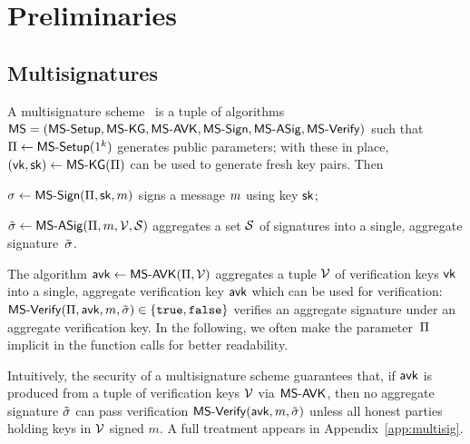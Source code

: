 \section{Preliminaries}\label{sec:prel}

\subsection{Multisignatures}\label{sec:multisig}
%
A multisignature scheme~\cite{itakura1983public,CCS:MicOhtRey01} is a
tuple of algorithms 
$\mathsf{MS} = (\mathsf{MS\textsf{-}{}Setup},\allowbreak\mathsf{MS\textsf{-}{}KG},\allowbreak\mathsf{MS\textsf{-}{}AVK},\allowbreak
\mathsf{MS\textsf{-}{}Sign},\mathsf{MS\textsf{-}{}ASig},\mathsf{MS\textsf{-}{}Verify})$ such that
$\Pi \gets \mathsf{MS\textsf{-}{}Setup}(1^k)$ generates public parameters;
with these in place,
$(\mathsf{vk},\mathsf{sk}) \gets \mathsf{MS\textsf{-}{}KG}(\Pi)$ can be used to generate
fresh key pairs. Then
\begin{mitemize}
  \item $\sigma \gets \mathsf{MS\textsf{-}{}Sign}(\Pi,\mathsf{sk},m)$ signs 
    a message $m$ using key $\mathsf{sk}$;
  \item $\tilde \sigma \gets \mathsf{MS\textsf{-}{}ASig}(\Pi,m,\mathcal V,\mathcal S)$ aggregates a
    set $\mathcal S$ of signatures into a single, aggregate signature~$\tilde \sigma$.
  \end{mitemize}
  The algorithm $\mathsf{avk} \gets \mathsf{MS\textsf{-}{}AVK}(\Pi,\mathcal V)$ aggregates
  a tuple $\mathcal V$ of verification keys $\mathsf{vk}$ into a single,
  aggregate verification key $\mathsf{avk}$ which can be used for verification:
  $\mathsf{MS\textsf{-}{}Verify}(\Pi,\mathsf{avk},m,\tilde \sigma) \in \{\mathtt{true},\mathtt{false}\}$
  verifies an aggregate signature under an aggregate verification key.
  In the following, we often make the parameter~$\Pi$ implicit in the
    function calls for better readability.

  Intuitively, the security of a multisignature scheme guarantees
  that, if $\mathsf{avk}$ is produced from a tuple of verification keys
  $\mathcal V$ via $\mathsf{MS\textsf{-}{}AVK}$, then no aggregate signature $\tilde \sigma$ can
  pass verification $\mathsf{MS\textsf{-}{}Verify}(\mathsf{avk},m,\tilde \sigma)$ unless all
  honest parties holding keys in $\mathcal V$ signed $m$. A full treatment
  appears in Appendix~\ref{app:multisig}.

